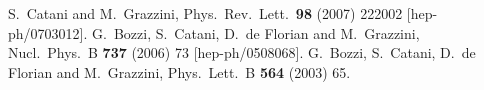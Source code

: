 \documentclass[12pt]{article}
\begin{document}
\begin{thebibliography}{99}



  S.~Catani and M.~Grazzini,
  Phys.\ Rev.\ Lett.\  {\bf 98} (2007) 222002
  [hep-ph/0703012].
%
  G.~Bozzi, S.~Catani, D.~de Florian and M.~Grazzini,
  Nucl.\ Phys.\ B {\bf 737} (2006) 73
  [hep-ph/0508068].
%
G.~Bozzi, S.~Catani, D.~de Florian and M.~Grazzini,
Phys.\ Lett.\ B {\bf 564} (2003) 65.



\end{thebibliography}
\end{document}

